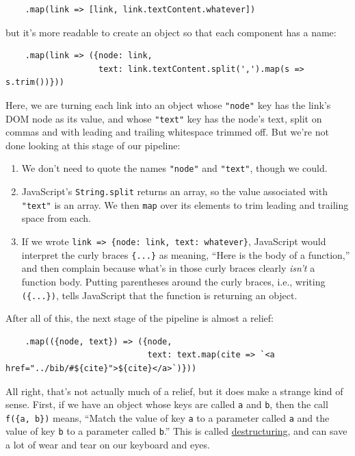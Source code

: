 \begin{verbatim}
    .map(link => [link, link.textContent.whatever])
\end{verbatim}

but it's more readable to create an object so that each component has a
name:

\begin{verbatim}
    .map(link => ({node: link,
                   text: link.textContent.split(',').map(s => s.trim())}))
\end{verbatim}

Here, we are turning each link into an object whose \texttt{"node"} key
has the link's DOM node as its value, and whose \texttt{"text"} key has
the node's text, split on commas and with leading and trailing
whitespace trimmed off. But we're not done looking at this stage of our
pipeline:

\begin{enumerate}
\tightlist
\item
  We don't need to quote the names \texttt{"node"} and \texttt{"text"},
  though we could.
\item
  JavaScript's \texttt{String.split} returns an array, so the value
  associated with \texttt{"text"} is an array. We then \texttt{map} over
  its elements to trim leading and trailing space from each.
\item
  If we wrote
  \texttt{link\ =\textgreater{}\ \{node:\ link,\ text:\ whatever\}},
  JavaScript would interpret the curly braces \texttt{\{...\}} as
  meaning, ``Here is the body of a function,'' and then complain because
  what's in those curly braces clearly \emph{isn't} a function body.
  Putting parentheses around the curly braces, i.e., writing
  \texttt{(\{...\})}, tells JavaScript that the function is returning an
  object.
\end{enumerate}

After all of this, the next stage of the pipeline is almost a relief:

\begin{verbatim}
    .map(({node, text}) => ({node,
                             text: text.map(cite => `<a href="../bib/#${cite}">${cite}</a>`)}))
\end{verbatim}

All right, that's not actually much of a relief, but it does make a
strange kind of sense. First, if we have an object whose keys are called
\texttt{a} and \texttt{b}, then the call \texttt{f(\{a,\ b\})} means,
``Match the value of key \texttt{a} to a parameter called \texttt{a} and
the value of key \texttt{b} to a parameter called \texttt{b}.'' This is
called \protect\hyperlink{g:destructuring}{destructuring}, and can save
a lot of wear and tear on our keyboard and eyes.

